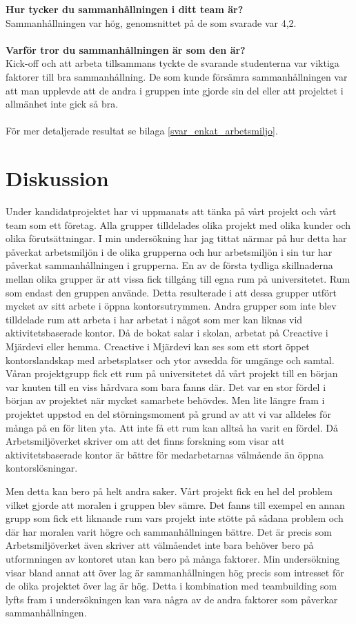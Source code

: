 \textbf{Hur tycker du sammanhållningen i ditt team är?}\\
Sammanhållningen var hög, genomsnittet på de som svarade var 4,2.\\\\
\textbf{Varför tror du sammanhållningen är som den är?}\\
Kick-off och att arbeta tillsammans tyckte de svarande studenterna var viktiga faktorer till bra sammanhållning. De som kunde försämra sammanhållningen var att man upplevde att de andra i gruppen inte gjorde sin del eller att projektet i allmänhet inte gick så bra.\\\\
För mer detaljerade resultat se bilaga \ref{svar_enkat_arbetsmiljo}.

\section{Diskussion}
\label{sec:discussion-hampus}

Under kandidatprojektet har vi uppmanats att tänka på vårt projekt och vårt team som ett företag. Alla grupper tilldelades olika projekt med olika kunder och olika förutsättningar. I min undersökning har jag tittat närmar på hur detta har påverkat arbetsmiljön i de olika grupperna och hur arbetsmiljön i sin tur har påverkat sammanhållningen i grupperna. En av de första tydliga skillnaderna mellan olika grupper är att vissa fick tillgång till egna rum på universitetet. Rum som endast den gruppen använde. Detta resulterade i att dessa grupper utfört mycket av sitt arbete i öppna kontorsutrymmen. Andra grupper som inte blev tilldelade rum att arbeta i har arbetat i något som mer kan liknas vid aktivitetsbaserade kontor. Då de bokat salar i skolan, arbetat på Creactive i Mjärdevi eller hemma. Creactive i Mjärdevi kan ses som ett stort öppet kontorslandskap med arbetsplatser och ytor avsedda för umgänge och samtal. Våran projektgrupp fick ett rum på universitetet då vårt projekt till en början var knuten till en viss hårdvara som bara fanns där. Det var en stor fördel i början av projektet när mycket samarbete behövdes. Men lite längre fram i projektet uppstod en del störningsmoment på grund av att vi var alldeles för många på en för liten yta. Att inte få ett rum kan alltså ha varit en fördel. Då Arbetsmiljöverket skriver om att det finns forskning som visar att aktivitetsbaserade kontor är bättre för medarbetarnas välmående än öppna kontorslösningar. 

Men detta kan bero på helt andra saker. Vårt projekt fick en hel del problem vilket gjorde att moralen i gruppen blev sämre. Det fanns till exempel en annan grupp som fick ett liknande rum vars projekt inte stötte på sådana problem och där har moralen varit högre och sammanhållningen bättre. Det är precis som Arbetsmiljöverket även skriver att välmåendet inte bara behöver bero på utformningen av kontoret utan kan bero på många faktorer. Min undersökning visar bland annat att över lag är sammanhållningen hög precis som intresset för de olika projektet över lag är hög. Detta i kombination med teambuilding som lyfts fram i undersökningen kan vara några av de andra faktorer som påverkar sammanhållningen.

